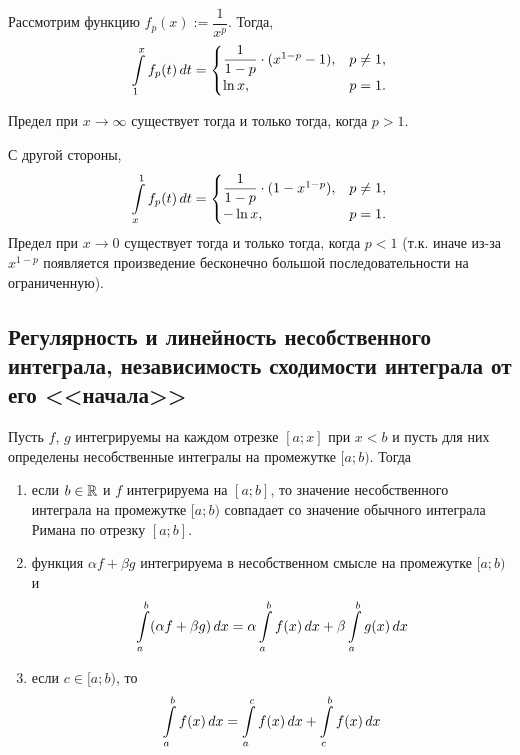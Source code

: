 \documentclass[a4paper]{article}
\theoremstyle{named}
\renewcommand{\int}{\intop}
\begin{document}
    	Рассмотрим функцию $f_p(x) := \dfrac{1}{x^p}$. Тогда,
    	\begin{equation*}
    		\int_1^x f_p(t) \dd t = \begin{cases}
    			\dfrac{1}{1 - p} \cdot (x^{1 - p} - 1), &p \neq 1, \\
    			\ln x, &p = 1.
    		\end{cases}
    	\end{equation*}

    	Предел при $x \to \infty$ существует тогда и только тогда, когда $p > 1$.

    	С другой стороны,
    	\begin{equation*}
    		\int_x^1 f_p(t) \dd t = \begin{cases}
    			\dfrac{1}{1 - p} \cdot (1 - x^{1 - p}), &p \neq 1, \\
    			-\ln x, &p = 1.
    		\end{cases}
    	\end{equation*}
    	Предел при $x \to 0$ существует тогда и только тогда, когда $p < 1$ (т.к. иначе из-за $x^{1 - p}$ появляется произведение бесконечно большой последовательности на ограниченную).

    	\subsection{Регулярность и линейность несобственного интеграла, независимость сходимости интеграла от его <<начала>>}

    	\begin{theorem*}
    		Пусть $f$, $g$ интегрируемы на каждом отрезке $[a; x]$ при $x < b$ и пусть для них определены несобственные интегралы на промежутке $[a; b)$. Тогда
    		\begin{enumerate}
    		\item
    			если $b \in \mathbb{R}$ и $f$ интегрируема на $[a; b]$, то значение несобственного интеграла на промежутке $[a; b)$ совпадает со значение обычного интеграла Римана по отрезку $[a; b]$.

    		\item
    			функция $\alpha f + \beta g$ интегрируема в несобственном смысле на промежутке $[a; b)$ и
    			\begin{equation*}
    				\int_a^b (\alpha f + \beta g) \dd x = \alpha \int_a^b f(x) \dd x + \beta \int_a^b g(x) \dd x
    			\end{equation*}

    		\item
    			если $c \in [a; b)$, то
    			\begin{equation*}
    				\int_a^b f(x) \dd x = \int_a^c f(x) \dd x + \int_c^b f(x) \dd x
    			\end{equation*}
    		\end{enumerate}
    	\end{theorem*}
\end{document}
